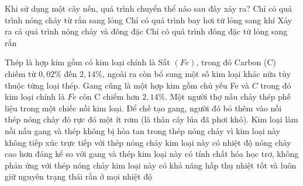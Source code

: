 \begin{ex} 
	Khi sử dụng một cây nến, quá trình chuyển thể nào sau đây xảy ra?
	\choice
	{Chỉ có quá trình nóng chảy từ rắn sang lỏng}
	{Chỉ có quá trình bay hơi từ lỏng sang khí}
	{\True Xảy ra cả quá trình nóng chảy và đông đặc}
	{Chỉ có quá trình đông đặc từ lỏng sang rắn}
\end{ex}




\begin{ex} 
	Thép là hợp kim gồm có kim loại chính là Sắt $(Fe)$, trong đó Carbon (C) chiếm từ $0,02 \%$ đến $2,14 \%$, ngoài ra còn bổ sung một số kim loại khác nữa tùy thuộc từng loại thép. Gang cũng là một hợp kim gồm chủ yếu Fe và $C$ trong đó kim loại chính là $Fe$ còn C chiếm hơn $2,14 \%$. Một người thợ nấu chảy thép phế liệu trong một chiếc nồi kim loại. Để chế tạo gang, người đó bỏ thêm vào nồi thép nóng chảy đỏ rực đó một ít rơm (là thân cây lúa đã phơi khô). Kim loại làm nồi nấu gang và thép không bị hòa tan trong thép nóng chảy vì
	\choice
	{kim loại này không tiếp xúc trực tiếp với thép nóng chảy}
	{\True kim loại này có nhiệt độ nóng chảy cao hơn đáng kể so với gang và thép}
	{kim loại này có tính chất hóa học trơ, không phản ứng với thép nóng chảy}
	{kim loại này có khả năng hấp thụ nhiệt tốt và luôn giữ nguyên trạng thái rắn ở mọi nhiệt độ}
\end{ex}






